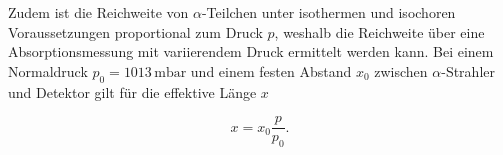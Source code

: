 \noindent Zudem ist die Reichweite von $\alpha$-Teilchen unter isothermen und isochoren Voraussetzungen proportional zum Druck $p$, 
weshalb die Reichweite über eine Absorptionsmessung mit variierendem Druck ermittelt werden kann. Bei einem Normaldruck 
$p_0 = 1013\,\unit{\milli\bar}$ und einem festen Abstand $x_0$ zwischen $\alpha$-Strahler und Detektor gilt für die effektive Länge $x$

\begin{equation}
\label{eqn:effLaenge}
    x = x_0\frac{p}{p_0}.
\end{equation}


%